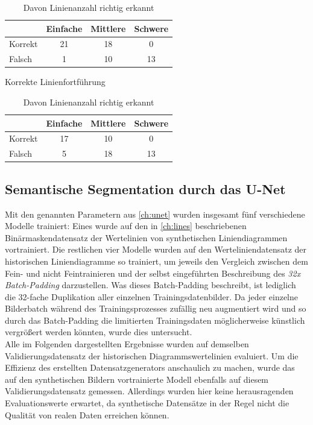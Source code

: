 \begin{table}[H]
    \centering
    \begin{minipage}{0.475\textwidth}
        \centering
        \begin{tabular}{|l|c|c|c|}
            \hline
            \rowcolor[HTML]{EFEFEF}
                    & Einfache & Mittlere & Schwere \\ \hline
            Korrekt & 21       & 18       & 0       \\ \hline
            Falsch  & 1        & 10       & 13      \\ \hline
        \end{tabular}
        \caption{Korrekte Linienfortführung \phantom{Platzhalter}}
    \end{minipage}%
    \hfill
    \begin{minipage}{0.475\textwidth}
        \centering
        \begin{tabular}{|l|c|c|c|}
            \hline
            \rowcolor[HTML]{EFEFEF}
                    & Einfache & Mittlere & Schwere \\ \hline
            Korrekt & 17       & 10       & 0       \\ \hline
            Falsch  & 5        & 18       & 13      \\ \hline
        \end{tabular}
        \caption{Davon Linienanzahl richtig erkannt}
    \end{minipage}
\end{table}

\subsection{Semantische Segmentation durch das U-Net}
\label{ch:eval_unet}

Mit den genannten Parametern aus \ref{ch:unet} wurden insgesamt fünf verschiedene Modelle trainiert: Eines wurde auf den in \ref{ch:lines} beschriebenen Binärmaskendatensatz der Wertelinien von synthetischen Liniendiagrammen vortrainiert. Die restlichen vier Modelle wurden auf den Werteliniendatensatz der historischen Liniendiagramme so trainiert, um jeweils den Vergleich zwischen dem Fein- und nicht Feintrainieren und der selbst eingeführten Beschreibung des \emph{32x Batch-Padding} darzustellen. Was dieses Batch-Padding beschreibt, ist lediglich die 32-fache Duplikation aller einzelnen Trainingsdatenbilder. Da jeder einzelne Bilderbatch während des Trainingsprozesses zufällig neu augmentiert wird und so durch das Batch-Padding die limitierten Trainingsdaten möglicherweise künstlich vergrößert werden könnten, wurde dies untersucht.
\\
Alle im Folgenden dargestellten Ergebnisse wurden auf demselben Validierungsdatensatz der historischen Diagrammswertelinien evaluiert. Um die Effizienz des erstellten Datensatzgenerators anschaulich zu machen, wurde das auf den synthetischen Bildern vortrainierte Modell ebenfalls auf diesem Validierungsdatensatz gemessen. Allerdings wurden hier keine herausragenden Evaluationswerte erwartet, da synthetische Datensätze in der Regel nicht die Qualität von realen Daten erreichen können.

